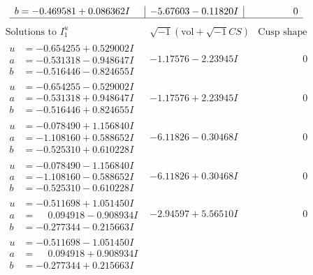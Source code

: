 \documentclass[1p]{elsarticle_modified}
\theoremstyle{definition}
\newcommand{\I}{\sqrt{-1}}
\begin{document}
$$\begin{array}{c|c|c}
\begin{aligned}
b &= -0.469581 + 0.086362 I\end{aligned}
 & -5.67603 - 0.11820 I & \phantom{-0.000000 } 0\\
 \hline 
 \end{array}$$\newpage$$\begin{array}{c|c|c}  
\text{Solutions to }I^u_{1}& \I (\text{vol} + \sqrt{-1}CS) & \text{Cusp shape}\\
 \hline 
\begin{aligned}
u &= -0.654255 + 0.529002 I \\
a &= -0.531318 - 0.948647 I \\
b &= -0.516446 - 0.824655 I\end{aligned}
 & -1.17576 - 2.23945 I & \phantom{-0.000000 } 0 \\ \hline\begin{aligned}
u &= -0.654255 - 0.529002 I \\
a &= -0.531318 + 0.948647 I \\
b &= -0.516446 + 0.824655 I\end{aligned}
 & -1.17576 + 2.23945 I & \phantom{-0.000000 } 0 \\ \hline\begin{aligned}
u &= -0.078490 + 1.156840 I \\
a &= -1.108160 + 0.588652 I \\
b &= -0.525310 + 0.610228 I\end{aligned}
 & -6.11826 - 0.30468 I & \phantom{-0.000000 } 0 \\ \hline\begin{aligned}
u &= -0.078490 - 1.156840 I \\
a &= -1.108160 - 0.588652 I \\
b &= -0.525310 - 0.610228 I\end{aligned}
 & -6.11826 + 0.30468 I & \phantom{-0.000000 } 0 \\ \hline\begin{aligned}
u &= -0.511698 + 1.051450 I \\
a &= \phantom{-}0.094918 - 0.908934 I \\
b &= -0.277344 - 0.215663 I\end{aligned}
 & -2.94597 + 5.56510 I & \phantom{-0.000000 } 0 \\ \hline\begin{aligned}
u &= -0.511698 - 1.051450 I \\
a &= \phantom{-}0.094918 + 0.908934 I \\
b &= -0.277344 + 0.215663 I\end{aligned}

\end{array}$$
\end{document}
